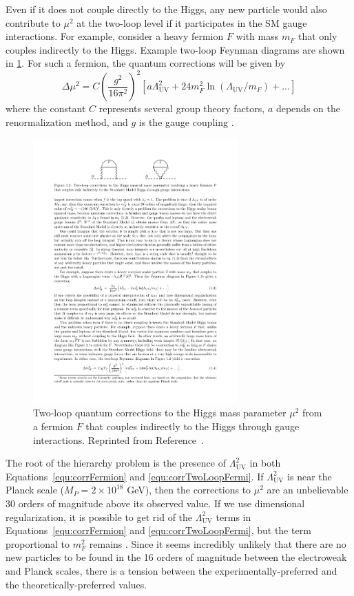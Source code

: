 Even if it does not couple directly to the Higgs, any new particle would also contribute to $\mu^2$ at the two-loop level if it participates in the SM gauge interactions. For example, consider a heavy fermion $F$ with mass $m_F$ that only couples indirectly to the Higgs. Example two-loop Feynman diagrams are shown in 
\ref{fig:hierarchyFermi}. For such a fermion, the quantum corrections will be given by
\begin{equation}
\Delta\mu^2 = C(\frac{g^2}{16\pi^2})^2 [a \Lambda^2_\mathrm{UV} + 24m_F^2 \ln(\Lambda_\mathrm{UV}/m_F) +...]
\label{equ:corrTwoLoopFermi}
\end{equation}
where the constant $C$ represents several group theory factors, $a$ depends on the renormalization method, and $g$ is the gauge coupling \cite{SUSYprimer}. 

\begin{figure}[htbp]
    \centering
    \includegraphics[width=0.7\textwidth]{Figures/Theory/hierarchyLoopFermi.pdf}
    \caption{Two-loop quantum corrections to the Higgs mass parameter $\mu^2$ from a fermion $F$ that couples indirectly to the Higgs through gauge interactions.
    Reprinted from Reference~\cite{SUSYprimer}.}
    \label{fig:hierarchyFermi}
\end{figure}

The root of the hierarchy problem is the presence of $\Lambda^2_\mathrm{UV}$ in both Equations~\ref{equ:corrFermion} and \ref{equ:corrTwoLoopFermi}. If $\Lambda^2_\mathrm{UV}$ is near the Planck scale ($M_P = 2 \times 10^{18}$ GeV), then the corrections to $\mu^2$ are an unbelievable 30 orders of magnitude above its observed value. If we use dimensional regularization, it is possible to get rid of the $\Lambda^2_\mathrm{UV}$ terms in Equations~\ref{equ:corrFermion} and \ref{equ:corrTwoLoopFermi}, but the term proportional to $m_F^2$ remains \cite{SUSYprimer}. Since it seems incredibly unlikely that there are no new particles to be found in the 16 orders of magnitude between the electroweak and Planck scales, there is a tension between the experimentally-preferred and the theoretically-preferred values.

